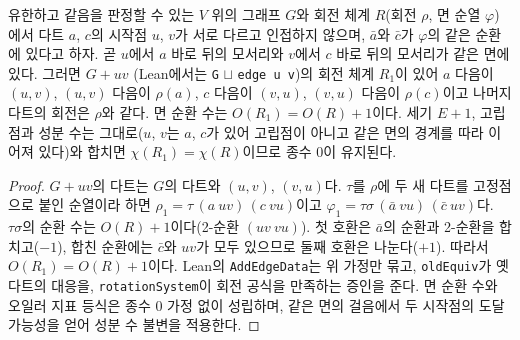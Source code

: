 \begin{lemma}[같은 면의 두 모서리를 잇는 변 넣기]
\label{lem:add_edge}
\leanok
유한하고 같음을 판정할 수 있는 \(V\) 위의 그래프 \(G\)와 회전 체계 \(R\)(회전 \(\rho\), 면 순열 \(\varphi\))에서 다트 \(a\),
\(c\)의 시작점 \(u\), \(v\)가 서로 다르고 인접하지 않으며, \(\bar a\)와 \(\bar c\)가 \(\varphi\)의 같은 순환에 있다고 하자.
곧 \(u\)에서 \(a\) 바로 뒤의 모서리와 \(v\)에서 \(c\) 바로 뒤의 모서리가 같은 면에 있다. 그러면 \(G + uv\)
(Lean에서는 \texttt{G} \(\sqcup\) \texttt{edge u v})의 회전 체계 \(R_1\)이 있어 \(a\) 다음이 \((u, v)\), \((u, v)\) 다음이 \(\rho(a)\),
\(c\) 다음이 \((v, u)\), \((v, u)\) 다음이 \(\rho(c)\)이고 나머지 다트의 회전은 \(\rho\)와 같다. 면 순환 수는
\(O(R_1) = O(R) + 1\)이다. 세기 \(E + 1\), 고립점과 성분 수는 그대로(\(u\), \(v\)는 \(a\), \(c\)가 있어 고립점이 아니고
같은 면의 경계를 따라 이어져 있다)와 합치면 \(\chi(R_1) = \chi(R)\)이므로 종수 0이 유지된다.
\end{lemma}

\begin{proof}
\leanok
\(G + uv\)의 다트는 \(G\)의 다트와 \((u, v)\), \((v, u)\)다. \(\tau\)를 \(\rho\)에 두 새 다트를 고정점으로 붙인 순열이라
하면 \(\rho_1 = \tau\,(a\ uv)\,(c\ vu)\)이고 \(\varphi_1 = \tau\sigma\,(\bar a\ vu)\,(\bar c\ uv)\)다. \(\tau\sigma\)의 순환 수는
\(O(R) + 1\)이다(2-순환 \((uv\ vu)\)). 첫 호환은 \(\bar a\)의 순환과 2-순환을 합치고(\(-1\)), 합친 순환에는 \(\bar c\)와
\(uv\)가 모두 있으므로 둘째 호환은 나눈다(\(+1\)). 따라서 \(O(R_1) = O(R) + 1\)이다.
Lean의 \texttt{AddEdgeData}는 위 가정만 묶고, \texttt{oldEquiv}가 옛 다트의 대응을,
\texttt{rotationSystem}이 회전 공식을 만족하는 증인을 준다. 면 순환 수와 오일러 지표 등식은 종수 0 가정 없이
성립하며, 같은 면의 걸음에서 두 시작점의 도달 가능성을 얻어 성분 수 불변을 적용한다.
\end{proof}

